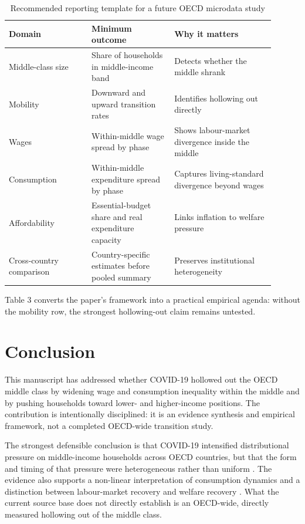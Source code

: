 \documentclass[11pt]{article}
\begin{document}
\begin{table}[t]
\centering
\caption{Recommended reporting template for a future OECD microdata study}
\begin{tabular}{p{0.28\linewidth}p{0.28\linewidth}p{0.34\linewidth}}
\toprule
Domain & Minimum outcome & Why it matters \\
\midrule
Middle-class size & Share of households in middle-income band & Detects whether the middle shrank \\
Mobility & Downward and upward transition rates & Identifies hollowing out directly \\
Wages & Within-middle wage spread by phase & Shows labour-market divergence inside the middle \\
Consumption & Within-middle expenditure spread by phase & Captures living-standard divergence beyond wages \\
Affordability & Essential-budget share and real expenditure capacity & Links inflation to welfare pressure \\
Cross-country comparison & Country-specific estimates before pooled summary & Preserves institutional heterogeneity \\
\bottomrule
\end{tabular}
\end{table}

\noindent Table 3 converts the paper's framework into a practical empirical agenda: without the mobility row, the strongest hollowing-out claim remains untested.

\section{Conclusion}
This manuscript has addressed whether COVID-19 hollowed out the OECD middle class by widening wage and consumption inequality within the middle and by pushing households toward lower- and higher-income positions. The contribution is intentionally disciplined: it is an evidence synthesis and empirical framework, not a completed OECD-wide transition study.

The strongest defensible conclusion is that COVID-19 intensified distributional pressure on middle-income households across OECD countries, but that the form and timing of that pressure were heterogeneous rather than uniform \citep{oecdemploymentoutl2024oecd,societyataglance202024bolletti}. The evidence also supports a non-linear interpretation of consumption dynamics and a distinction between labour-market recovery and welfare recovery \citep{consumptioninequal2024bls}. What the current source base does not directly establish is an OECD-wide, directly measured hollowing out of the middle class.
\end{document}
